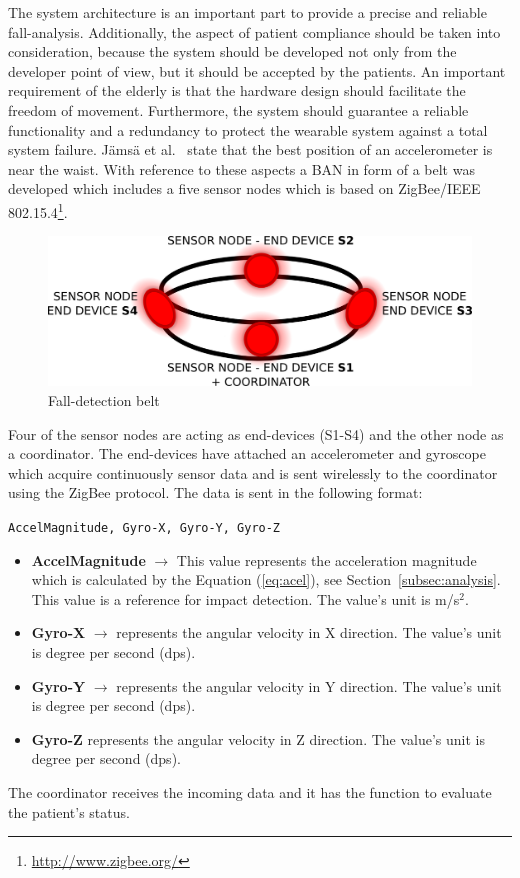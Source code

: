 \documentclass[review]{elsarticle}
\begin{document}
The system architecture is an important part to provide a precise and reliable fall-analysis. 
Additionally, the aspect of patient compliance should be taken into consideration, because the 
system should be developed not only from the developer point of view, but it should be accepted 
by the patients. An important requirement of the elderly is that the hardware design should 
facilitate the freedom of movement. Furthermore, the system should guarantee a reliable 
functionality and a redundancy to protect the wearable system against
a total system failure. J{\"a}ms{\"a} et al.~\cite{jamsa2014fall} state that the best
position of an accelerometer is near the waist.
With reference to these aspects a BAN in form of a belt was developed which 
includes a five sensor nodes which is based on ZigBee/IEEE 802.15.4\footnote{\url{http://www.zigbee.org/}}.

\begin{figure}[!ht]
  \centering
  \includegraphics[scale=0.25]{./img/belt}
  \caption[Fall-detection belt]{Fall-detection belt~\cite{LaBlunda.2016,LaBlunda.2016b}}
  \label{fig:belt}
\end{figure}

Four of the sensor nodes are acting as end-devices (S1-S4) and the other node as a coordinator. 
The end-devices have attached an accelerometer and gyroscope which acquire continuously sensor 
data and is sent wirelessly to the coordinator using the ZigBee protocol. The data is sent in the following format:
 \begin{center}
  \texttt{AccelMagnitude, Gyro-X, Gyro-Y, Gyro-Z}
 \end{center}
\begin{itemize}
  \item \textbf{AccelMagnitude} $\rightarrow$ This value represents the acceleration magnitude which is calculated 
  by the Equation (\ref{eq:acel}), see Section~\ref{subsec:analysis}. This value is a reference for impact detection. 
  The value's unit is m/s$^2$.
  \item \textbf{Gyro-X} $\rightarrow$ represents the angular velocity in X direction. The value's unit is 
  degree per second (dps).
  \item \textbf{Gyro-Y} $\rightarrow$ represents the angular velocity in Y direction. The value's unit is 
  degree per second (dps).
  \item \textbf{Gyro-Z} represents the angular velocity in Z direction. The value's unit is degree per second (dps).
\end{itemize}
The coordinator receives the incoming data and it has the function to evaluate the patient's status.
\end{document}
